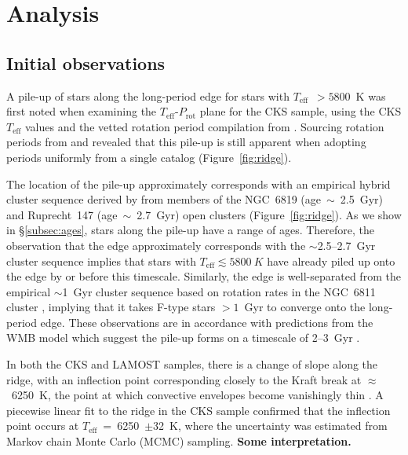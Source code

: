 \documentclass[linenumbers,tighten,trackchanges,twocolumn]{aastex631}
\newcommand{\teff}{\ensuremath{T_{\mathrm{eff}}}\xspace}
\newcommand{\prot}{\ensuremath{P_\mathrm{rot}}\xspace}
\begin{document}
\section{Analysis}
\label{sec:analysis}

\subsection{Initial observations}
A pile-up of stars along the long-period edge for stars with \teff~$>5800$~K was first noted when examining the \teff-\prot plane for the CKS sample, using the CKS \teff values and the vetted rotation period compilation from \citet{David2021}. Sourcing rotation periods from \citet{McQuillan2013, Mazeh2015} and \citet{Angus2018} revealed that this pile-up is still apparent when adopting periods uniformly from a single catalog (Figure~\ref{fig:ridge}). 

The location of the pile-up approximately corresponds with an empirical hybrid cluster sequence derived by \citet{Curtis2020} from members of the NGC~6819 (age~$\sim$~2.5~Gyr) and Ruprecht~147 (age~$\sim$~2.7~Gyr) open clusters (Figure~\ref{fig:ridge}). As we show in \S\ref{subsec:ages}, stars along the pile-up have a range of ages. Therefore, the observation that the edge approximately corresponds with the $\sim$2.5--2.7~Gyr cluster sequence implies that stars with \teff$\lesssim 5800~K$ have already piled up onto the edge by or before this timescale. Similarly, the edge is well-separated from the empirical $\sim$1~Gyr cluster sequence based on rotation rates in the NGC~6811 cluster \citep{Curtis2020}, implying that it takes F-type stars $>1$~Gyr to converge onto the long-period edge. These observations are in accordance with predictions from the WMB model which suggest the pile-up forms on a timescale of 2--3~Gyr \citep{vanSaders2019}.

In both the CKS and LAMOST samples, there is a change of slope along the ridge, with an inflection point corresponding closely to the Kraft break at $\approx$~6250~K, the point at which convective envelopes become vanishingly thin \citep{Kraft1967}. A piecewise linear fit to the ridge in the CKS sample confirmed that the inflection point occurs at \teff~=~6250~$\pm$32~K, where the uncertainty was estimated from Markov chain Monte Carlo (MCMC) sampling. \textbf{Some interpretation.}
\end{document}
